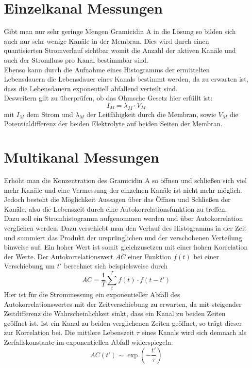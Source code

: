 \documentclass{include/thesisclass3}
\newcommand{\cc}{\cdot}
\begin{document}


\section{Einzelkanal Messungen}
Gibt man nur sehr geringe Mengen Gramicidin A in die Lösung so bilden sich auch nur sehr wenige Kanäle in der Membran. Dies wird durch einen quantisierten Stromverlauf sichtbar womit die Anzahl der aktiven Kanäle und auch der Stromfluss pro Kanal bestimmbar sind.\\
Ebenso kann durch die Aufnahme eines Histogramms der ermittelten Lebensdauern die Lebensdauer eines Kanals bestimmt werden, da zu erwarten ist, dass die Lebensdauern exponentiell abfallend verteilt sind.\\
Desweitern gilt zu überprüfen, ob das Ohmsche Gesetz hier erfüllt ist:
\[ I_M = \lambda_M \cc V_M\]
mit $I_M$ dem Strom und $\lambda_M$ der Leitfähigkeit durch die Membran, sowie $V_M$ die Potentialdifferenz der beiden Elektrolyte auf beiden Seiten der Membran.


\section{Multikanal Messungen}
Erhöht man die Konzentration des Gramicidin A so öffnen und schließen sich viel mehr Kanäle und eine Vermessung der einzelnen Kanäle ist nicht mehr möglich. Jedoch besteht die Möglichkeit Aussagen über das Öffnen und Schließen der Kanäle, also die Lebenszeit durch eine Autokorrelationsfunktion zu treffen.\\
Dazu soll ein Stromhistogramm aufgenommen werden und über Autokorrelation verglichen werden. Dazu verschiebt man den Verlauf des Histogramms in der Zeit und summiert das Produkt der ursprünglichen und der verschobenen Verteilung binweise auf. Ein hoher Wert ist somit gleichzusetzen mit einer hohen Korrelation der Werte. Der Autokorrelationswert $AC$ einer Funktion $f(t)$ bei einer Verschiebung um $t'$ berechnet sich beispielsweise durch
\[ AC = \frac{1}{T}\sum_t^T f(t)\cc f(t-t') \]
Hier ist für die Strommessung ein exponentieller Abfall des Autokorrelationswertes mit der Zeitverschiebung zu erwarten, da mit steigender Zeitdifferenz die Wahrscheinlichkeit sinkt, dass ein Kanal zu beiden Zeiten geöffnet ist. Ist ein Kanal zu beiden verglichenen Zeiten geöffnet, so trägt dieser zur Korrelation bei. Die mittlere Lebenszeit $\tau$ eines Kanals wird sich demnach als Zerfallskonstante im exponentiellen Abfall widerspiegeln:
\[ AC(t') \sim \exp\left( - \frac{t'}{\tau}\right)\]
\end{document}

